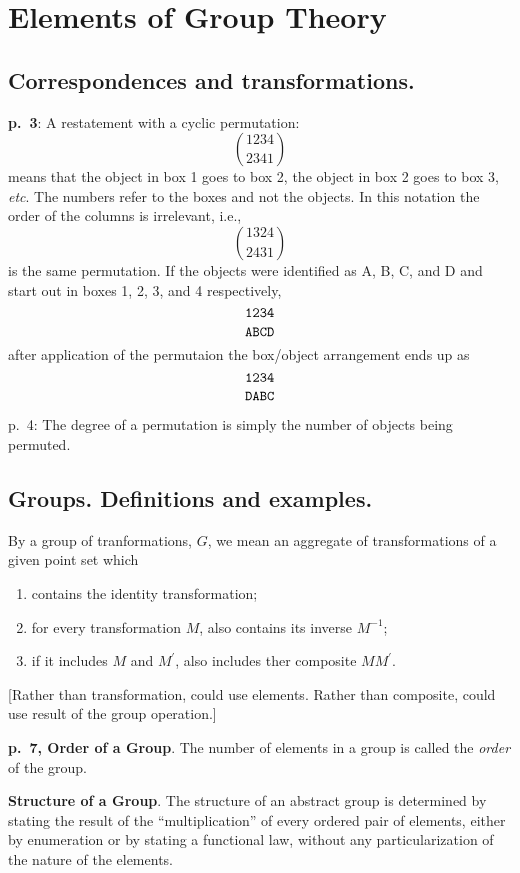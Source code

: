 \chapter{Elements of Group Theory}

\section{Correspondences and transformations.}

{\bf p.\ 3}: A restatement with a cyclic permutation:
$$
\genfrac(){0pt}0{1234}{2341}
$$
means that the object in box 1 goes to box 2, the object in box 2 goes
to box 3, {\it etc}. The numbers refer to the boxes and not the
objects. In this notation the order of the columns is irrelevant,
i.e.,
$$
\genfrac(){0pt}0{1324}{2431}
$$
is the same permutation.  If the objects were identified as A, B, C,
and D and start out in boxes 1, 2, 3, and 4 respectively,
$$
\genfrac{}{}{0pt}0{\tt 1234}{\tt ABCD}
$$
after application of the permutaion the box/object arrangement ends up as
$$
\genfrac{}{}{0pt}0{\tt 1234}{\tt DABC}
$$

p.\ 4: The degree of a permutation is simply the number of objects
being permuted.

\section{Groups. Definitions and examples.}

By a group of tranformations, $G$, we mean an aggregate of
transformations of a given point set which
\begin{enumerate}
\item contains the identity transformation;
\item for every transformation $M$, also contains its inverse $M^{-1}$;
\item if it includes $M$ and $M^\prime$, also includes ther composite $MM^\prime$.
\end{enumerate}

[Rather than transformation, could use elements. Rather than
  composite, could use result of the group operation.]

{\bf p.\ 7, Order of a Group}. The number of elements in a group is
called the {\it order} of the group.

{\bf Structure of a Group}. The structure of an abstract group is
determined by stating the result of the ``multiplication'' of every
ordered pair of elements, either by enumeration or by stating a
functional law, without any particularization of the nature of the
elements.

